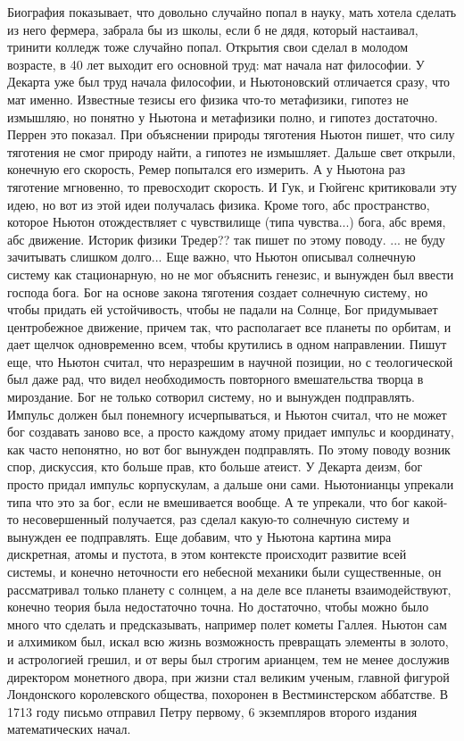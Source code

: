 \documentclass[a4paper, 12pt]{article}
\begin{document}
Биография показывает, что довольно случайно попал в науку, мать хотела 
сделать из него фермера, забрала бы из школы, если б не дядя, который 
настаивал, тринити колледж тоже случайно попал. Открытия свои сделал 
в молодом возрасте, в 40 лет выходит его основной труд: мат начала нат 
философии. У Декарта уже был труд начала философии, и Ньютоновский 
отличается сразу, что мат именно. Известные тезисы его физика что-то 
метафизики, гипотез не измышляю, но понятно у Ньютона и метафизики 
полно, и гипотез достаточно. Перрен это показал. При объяснении природы 
тяготения Ньютон пишет, что силу тяготения не смог природу найти, 
а гипотез не измышляет. Дальше свет открыли, конечную его скорость, 
Ремер попытался его измерить. А у Ньютона раз тяготение мгновенно, то 
превосходит скорость. И Гук, и Гюйгенс критиковали эту идею, но вот из 
этой идеи получалась физика. Кроме того, абс пространство, которое 
Ньютон отождествляет с чувствилище (типа чувства...) бога, абс время, 
абс движение. Историк физики Тредер?? так пишет по этому поводу. ... не 
буду зачитывать слишком долго... Еще важно, что Ньютон описывал 
солнечную систему как стационарную, но не мог объяснить генезис, 
и вынужден был ввести господа бога. Бог на основе закона тяготения 
создает солнечную систему, но чтобы придать ей устойчивость, чтобы не 
падали на Солнце, Бог придумывает центробежное движение, причем так, что 
располагает все планеты по орбитам, и дает щелчок одновременно всем, 
чтобы крутились в одном направлении. Пишут еще, что Ньютон считал, что 
неразрешим в научной позиции, но с теологической был даже рад, что видел 
необходимость повторного вмешательства творца в мироздание. Бог не 
только сотворил систему, но и вынужден подправлять. Импульс должен был 
понемногу исчерпываться, и Ньютон считал, что не может бог создавать 
заново все, а просто каждому атому придает импульс и координату, как 
часто непонятно, но вот бог вынужден подправлять. По этому поводу возник 
спор, дискуссия, кто больше прав, кто больше атеист. У Декарта деизм, 
бог просто придал импульс корпускулам, а дальше они сами. Ньютонианцы 
упрекали типа что это за бог, если не вмешивается вообще. А те упрекали, 
что бог какой-то несовершенный получается, раз сделал какую-то солнечную 
систему и вынужден ее подправлять. Еще добавим, что у Ньютона картина 
мира дискретная, атомы и пустота, в этом контексте происходит развитие 
всей системы, и конечно неточности его небесной механики были 
существенные, он рассматривал только планету с солнцем, а на деле все 
планеты взаимодействуют, конечно теория была недостаточно точна. Но 
достаточно, чтобы можно было много что сделать и предсказывать, например 
полет кометы Галлея. Ньютон сам и алхимиком был, искал всю жизнь 
возможность превращать элементы в золото, и астрологией грешил, и от 
веры был строгим арианцем, тем не менее дослужив директором монетного 
двора, при жизни стал великим ученым, главной фигурой Лондонского 
королевского общества, похоронен в Вестминстерском аббатстве. В 1713 
году письмо отправил Петру первому, 6 экземпляров второго издания 
математических начал.
\end{document}
